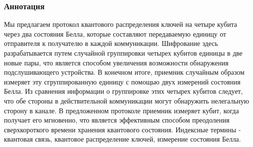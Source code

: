 \subsubsection*{Аннотация}

Мы предлагаем протокол квантового распределения ключей на четыре кубита через два состояния Белла, которые составляют передаваемую единицу от отправителя к получателю в каждой коммуникации.
Шифрование здесь разрабатывается путем случайной группировки четырех кубитов единицы в две новые пары, что является способом увеличения возможности обнаружения подслушивающего устройства. В конечном итоге, приемник случайным образом измеряет эту сгруппированную единицу с помощью двух измерений состояния Белла. Из сравнения информации о группировке этих четырех кубитов следует, что обе стороны в действительной коммуникации могут обнаружить нелегальную сторону в канале. В предложенном протоколе приемник измеряет кубит, когда получает его мгновенно, что является эффективным способом преодоления сверхкороткого времени хранения квантового состояния.
Индексные термины - квантовая связь, квантовое распределение ключей, измерение состояния Белла.

